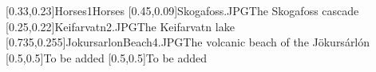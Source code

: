 



\graphicspath{{Figures/}{Figures/Iceland/}}


\subtitle{Day 3}
\date{28.10.2019}


    
    [0.33,0.23]{Horses1}{Horses}
    [0.45,0.09]{Skogafoss.JPG}{The Skogafoss cascade}
    [0.25,0.22]{Keifarvatn2.JPG}{The Keifarvatn lake}
    [0.735,0.255]{JokursarlonBeach4.JPG}{The volcanic beach of the J\"okurs\'arl\'on}
    [0.5,0.5]{}{To be added}
    [0.5,0.5]{}{To be added}
    

